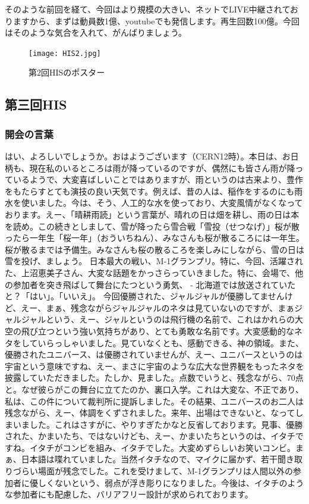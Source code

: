 そのような前回を経て、今回はより規模の大きい、ネットでLIVE中継されておりますから、まずは動員数1億、youtubeでも発信します。再生回数100億。今回はそのような気合を入れて、がんばりましょう。

\begin{figure}[H]
\centering
\texttt{[image: HIS2.jpg]}
\caption{第2回HISのポスター}
\label{HIS2}
\end{figure}


\subsection{第三回HIS}
\subsubsection{開会の言葉}
はい、よろしいでしょうか。おはようございます（CERN12時）。本日は、お日柄も、現在私のいるところは雨が降っているのですが、偶然にも皆さん雨が降っているようで、大変喜ばしいことではありますが、雨というのは古来より、豊作をもたらすとても演技の良い天気です。例えば、昔の人は、稲作をするのにも雨水を使いました。今は、そう、人工的な水を使っており、大変風情がなくなっております。えー、「晴耕雨読」という言葉が、晴れの日は畑を耕し、雨の日は本を読め。この続きとしまして、雪が降ったら雪合戦「雪投（せつなげ）」桜が散ったら一年生「桜一年」（おういちねん）、みなさんも桜が散るころには一年生。桜が散るまでは予備生。みなさんも桜の散るころを楽しみにしながら、雪の日は雪を投げ、ましょう。
日本最大の戦い、M-1グランプリ。特に、今回、活躍された、上沼恵美子さん、大変な話題をかっさらっていきました。特に、会場で、他の参加者を突き飛ばして舞台にたつという勇気、
- 北海道では放送されていたと？「はい」。「いいえ」。
今回優勝された、ジャルジャルが優勝してませんけど、えー、まぁ、残念ながらジャルジャルのネタは見ていないのですが、まぁジャルジャルという、えー、ジャルというのは飛行機の名前で、これはかれらの大空の飛び立つという強い気持ちがあり、とても勇敢な名前です。大変感動的なネタをしていらっしゃいました。見ていなくとも、感動できる、神の領域。また、優勝されたユニバース、は優勝されていませんが、えー、ユニバースというのは宇宙という意味ですね、えー、まさに宇宙のような広大な世界観をもったネタを披露していただきました。たしか、見ました。点数でいうと、残念ながら、70点と。なぜ彼らがこの舞台に立てたのか、裏口入学。これは大変な、不正であり、私は、この件について裁判所に提訴しました。その結果、ユニバースのお二人は残念ながら、えー、体調をくずされました。来年、出場はできないと、なってしまいました。これはさすがに、やりすぎたかなと反省しております。見事、優勝された、かまいたち、ではないけども、えー、かまいたちというのは、イタチですね。イタチがコンビを組み、イタチでした。大変めずらしいお笑いコンビ。まぁ、日本語は喋れていました。当然イタチなので、マイクに届かず、若干聞き取りづらい場面が残念でした。これを受けまして、M-1グランプリは人間以外の参加者に優しくないという、弱点が浮き彫りになりました。今後は、イタチのような参加者にも配慮した、バリアフリー設計が求められております。
